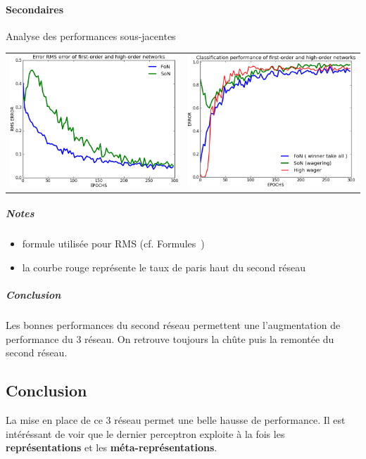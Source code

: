     \paragraph{Secondaires}
      Analyse des performances sous-jacentes
      \begin{center}
	\begin{tabular}{lr}
	  \hspace*{-1cm}
	  \includegraphics[width=250px]{data/expF2/rms.png}
	  &
	  \includegraphics[width=250px]{data/expF2/perf.png}
	\end{tabular}
      \end{center} 
      \subparagraph{Notes}
	\begin{itemize}
	  \item formule utilisée pour RMS (cf. Formules~)
	  \item la courbe rouge représente le taux de paris haut du second réseau
	\end{itemize}
      \subparagraph{Conclusion}
	Les bonnes performances du second réseau permettent une l'augmentation de performance du 3 réseau.
	On retrouve toujours la chûte puis la remontée du second réseau.


  \subsection{Conclusion}
  La mise en place de ce 3 réseau permet une belle hausse de performance. Il est intéréssant de voir
  que le dernier perceptron exploite à la fois les \textbf{représentations} et les \textbf{méta-représentations}.
  
